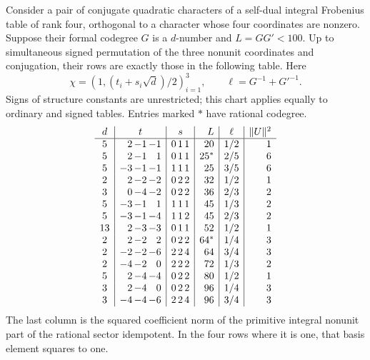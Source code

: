\begin{lemma}\label{qs:chart}
Consider a pair of conjugate quadratic characters of a self-dual
integral Frobenius table of rank four, orthogonal to a character
whose four coordinates are nonzero. Suppose their formal codegree
$G$ is a $d$-number and $L=GG'<100$. Up to simultaneous signed
permutation of the three nonunit coordinates and conjugation, their
rows are exactly those in the following table. Here
\[
 \chi=(1,(t_i+s_i\sqrt d)/2)_{i=1}^3,\qquad
 \ell=G^{-1}+G'^{-1}.
\]
Signs of structure constants are unrestricted; this chart applies
equally to ordinary and signed tables. Entries marked $*$ have
rational codegree.
\[
\begin{array}{c|r@{\,}r@{\,}r|r@{\,}r@{\,}r|r|c|r}
d&\multicolumn{3}{c|}{t}&\multicolumn{3}{c|}{s}&L&\ell&\|U\|^2\\\hline
5&2&-1&-1&0&1&1&20&1/2&1\\
5&2&-1&1&0&1&1&25^*&2/5&6\\
5&-3&-1&-1&1&1&1&25&3/5&6\\
2&2&-2&-2&0&2&2&32&1/2&1\\
3&0&-4&-2&0&2&2&36&2/3&2\\
5&-3&-1&1&1&1&1&45&1/3&2\\
5&-3&-1&-4&1&1&2&45&2/3&2\\
13&2&-3&-3&0&1&1&52&1/2&1\\
2&2&-2&2&0&2&2&64^*&1/4&3\\
2&-2&-2&-6&2&2&4&64&3/4&3\\
2&-4&-2&0&2&2&2&72&1/3&2\\
5&2&-4&-4&0&2&2&80&1/2&1\\
3&2&-4&0&0&2&2&96&1/4&3\\
3&-4&-4&-6&2&2&4&96&3/4&3
\end{array}
\]
The last column is the squared coefficient norm of the primitive
integral nonunit part of the rational sector idempotent.
In the four rows where it is one, that basis element squares to one.
\end{lemma}

